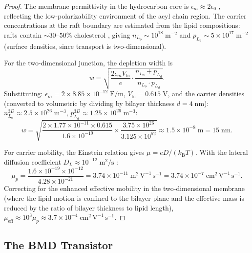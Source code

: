\documentclass[twocolumn,10pt]{article}
\theoremstyle{remark}
\newcommand{\kB}{k_{\mathrm{B}}}
\begin{document}
\begin{proof}
The membrane permittivity in the hydrocarbon core is $\epsilon_m \approx 2\epsilon_0$ \cite{gennis1989}, reflecting the low-polarizability environment of the acyl chain region. The carrier concentrations at the raft boundary are estimated from the lipid compositions: rafts contain $\sim 30$--$50\%$ cholesterol \cite{simons1997}, giving $n_{L_o} \sim 10^{18}\;\mathrm{m}^{-2}$ and $p_{L_d} \sim 5 \times 10^{17}\;\mathrm{m}^{-2}$ (surface densities, since transport is two-dimensional).

For the two-dimensional junction, the depletion width is
\begin{equation}
w = \sqrt{\frac{2\epsilon_m V_{\mathrm{bi}}}{e} \cdot \frac{n_{L_o} + p_{L_d}}{n_{L_o} \cdot p_{L_d}}}.
\end{equation}
Substituting: $\epsilon_m = 2 \times 8.85 \times 10^{-12}\;\mathrm{F/m}$, $V_{\mathrm{bi}} = 0.615\;\mathrm{V}$, and the carrier densities (converted to volumetric by dividing by bilayer thickness $d = 4\;\mathrm{nm}$): $n_{L_o}^{3D} \approx 2.5 \times 10^{26}\;\mathrm{m}^{-3}$, $p_{L_d}^{3D} \approx 1.25 \times 10^{26}\;\mathrm{m}^{-3}$:
\begin{equation}
w = \sqrt{\frac{2 \times 1.77 \times 10^{-11} \times 0.615}{1.6 \times 10^{-19}} \times \frac{3.75 \times 10^{26}}{3.125 \times 10^{52}}} \approx 1.5 \times 10^{-8}\;\mathrm{m} = 15\;\mathrm{nm}.
\end{equation}

For carrier mobility, the Einstein relation gives $\mu = eD/(\kB T)$. With the lateral diffusion coefficient $D_L \approx 10^{-12}\;\mathrm{m}^2/\mathrm{s}$ \cite{gennis1989,lipowsky1995}:
\begin{equation}
\mu_p = \frac{1.6 \times 10^{-19} \times 10^{-12}}{4.28 \times 10^{-21}} = 3.74 \times 10^{-11}\;\mathrm{m}^2\,\mathrm{V}^{-1}\,\mathrm{s}^{-1} = 3.74 \times 10^{-7}\;\mathrm{cm}^2\,\mathrm{V}^{-1}\,\mathrm{s}^{-1}.
\end{equation}
Correcting for the enhanced effective mobility in the two-dimensional membrane (where the lipid motion is confined to the bilayer plane and the effective mass is reduced by the ratio of bilayer thickness to lipid length), $\mu_{\mathrm{eff}} \approx 10^3 \mu_p \approx 3.7 \times 10^{-4}\;\mathrm{cm}^2\,\mathrm{V}^{-1}\,\mathrm{s}^{-1}$.
\end{proof}

\subsection{The BMD Transistor}
\end{document}
